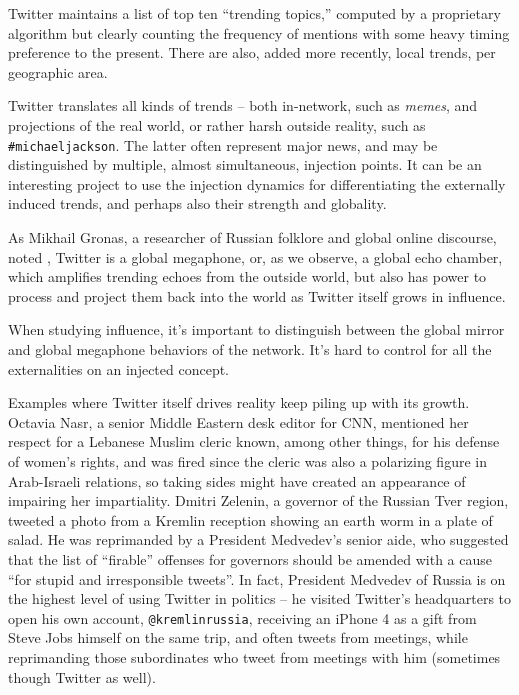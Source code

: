 \documentclass[10pt,oneside]{memoir}
\begin{document}
\begin{Spacing}{2}
Twitter maintains a list of top ten ``trending topics,'' computed by a proprietary algorithm but clearly counting the frequency of mentions with some heavy timing preference to the present.  There are also, added more recently, local trends, per geographic area.  


Twitter translates all kinds of trends -- both in-network, such as {\itshape memes}, and projections of the real world, or rather harsh outside reality, such as \texttt{\#michaeljackson}.  The latter often represent major news, and may be distinguished by multiple, almost simultaneous, injection points.  It can be an interesting project to use the injection dynamics for differentiating the externally induced trends, and perhaps also their strength and globality.


As Mikhail Gronas, a researcher of Russian folklore and global online discourse, noted \cite{Gronas:2010:Private}, Twitter is a global megaphone, or, as we observe, a global echo chamber, which amplifies trending echoes from the outside world, but also has power to process and project them back into the world as Twitter itself grows in influence.


When studying influence, it's important to distinguish between the global mirror and global megaphone behaviors of the network.  It's hard to control for all the externalities on an injected concept.  


Examples where Twitter itself drives reality keep piling up with its growth.  Octavia Nasr, a senior Middle Eastern desk editor for CNN, mentioned her respect for a Lebanese Muslim cleric known, among other things, for his defense of women's rights, and was fired since the cleric was also a polarizing figure in Arab-Israeli relations, so taking sides might have created an appearance of impairing her impartiality.  Dmitri Zelenin, a governor of the Russian Tver region, tweeted a photo from a Kremlin reception showing an earth worm in a plate of salad.  He was reprimanded by a President Medvedev's senior aide, who suggested that the list of ``firable'' offenses for governors should be amended with a cause ``for stupid and irresponsible tweets''.  In fact, President Medvedev of Russia is on the highest level of using Twitter in politics -- he visited Twitter's headquarters to open his own account, \texttt{@kremlinrussia}, receiving an iPhone 4 as a gift from Steve Jobs himself on the same trip, and often tweets from meetings, while reprimanding those subordinates who tweet from meetings with him (sometimes though Twitter as well).



\end{Spacing}
\end{document}
